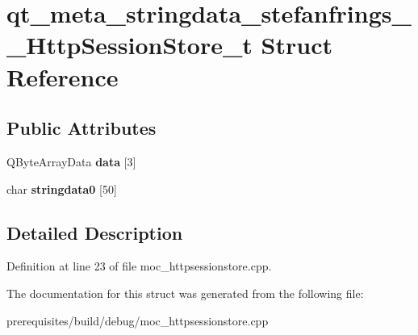 \hypertarget{structqt__meta__stringdata__stefanfrings_____http_session_store__t}{}\section{qt\+\_\+meta\+\_\+stringdata\+\_\+stefanfrings\+\_\+\+\_\+\+Http\+Session\+Store\+\_\+t Struct Reference}
\label{structqt__meta__stringdata__stefanfrings_____http_session_store__t}
\subsection*{Public Attributes}
\begin{DoxyCompactItemize}
\item 
\mbox{\label{structqt__meta__stringdata__stefanfrings_____http_session_store__t_a92a96c1875154b3a18ce2b305225217c}} 
Q\+Byte\+Array\+Data {\bfseries data} \mbox{[}3\mbox{]}
\item 
\mbox{\label{structqt__meta__stringdata__stefanfrings_____http_session_store__t_a0314cac83cb4d5417cc7c14c90e1b923}} 
char {\bfseries stringdata0} \mbox{[}50\mbox{]}
\end{DoxyCompactItemize}


\subsection{Detailed Description}


Definition at line 23 of file moc\+\_\+httpsessionstore.\+cpp.



The documentation for this struct was generated from the following file\+:\begin{DoxyCompactItemize}
\item 
prerequisites/build/debug/moc\+\_\+httpsessionstore.\+cpp\end{DoxyCompactItemize}
